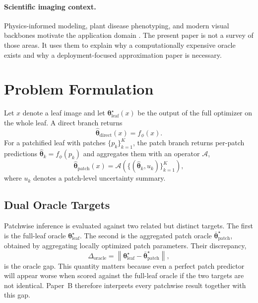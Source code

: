 \documentclass[11pt,a4paper]{article}
\newcommand{\btheta}{\boldsymbol{\theta}}
\begin{document}
\paragraph{Scientific imaging context.}
Physics-informed modeling, plant disease phenotyping, and modern visual backbones motivate the application domain \citep{B_raissi2019,B_mahlein2016,B_he2016,B_oquab2024}.
The present paper is not a survey of those areas.
It uses them to explain why a computationally expensive oracle exists and why a deployment-focused approximation paper is necessary.

\section{Problem Formulation}
Let $x$ denote a leaf image and let $\btheta^{\star}_{\mathrm{leaf}}(x)$ be the output of the full optimizer on the whole leaf.
A direct branch returns
\begin{equation}
\hat{\btheta}_{\mathrm{direct}}(x)=f_\phi(x).
\end{equation}
For a patchified leaf with patches $\{p_k\}_{k=1}^{K}$, the patch branch returns per-patch predictions $\hat{\btheta}_k=f_\phi(p_k)$ and aggregates them with an operator $\mathcal{A}$,
\begin{equation}
\hat{\btheta}_{\mathrm{patch}}(x)=\mathcal{A}\left(\{(\hat{\btheta}_k,u_k)\}_{k=1}^{K}\right),
\end{equation}
where $u_k$ denotes a patch-level uncertainty summary.

\subsection{Dual Oracle Targets}
Patchwise inference is evaluated against two related but distinct targets.
The first is the full-leaf oracle $\btheta^{\star}_{\mathrm{leaf}}$.
The second is the aggregated patch oracle $\bar{\btheta}^{\star}_{\mathrm{patch}}$, obtained by aggregating locally optimized patch parameters.
Their discrepancy,
\begin{equation}
\Delta_{\mathrm{oracle}}=\left\lVert \btheta^{\star}_{\mathrm{leaf}}-\bar{\btheta}^{\star}_{\mathrm{patch}}\right\rVert,
\end{equation}
is the oracle gap.
This quantity matters because even a perfect patch predictor will appear worse when scored against the full-leaf oracle if the two targets are not identical.
Paper~B therefore interprets every patchwise result together with this gap.
\end{document}
